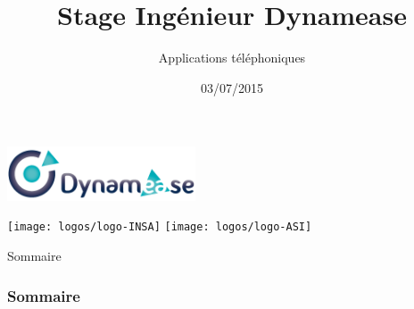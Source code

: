 \documentclass[9pt,xcolor=table]{beamer}
\title{Stage Ingénieur Dynamease}
\subtitle{Applications téléphoniques}
\date{03/07/2015}
\begin{document}
	\begin{frame}
		\titlepage
		\begin{center}
			\includegraphics[height=16mm]{images/logo-dynamease}
		\end{center}
		\vspace{7mm}
		\texttt{[image: logos/logo-INSA]}
		\hspace{2mm}
		\texttt{[image: logos/logo-ASI]}
	\end{frame}


	\begin{frame}{Sommaire}
		\frametitle{Sommaire}
		 \small \tableofcontents
	\end{frame}
    
    
	 
	 
	 
	 
	 
\end{document}
